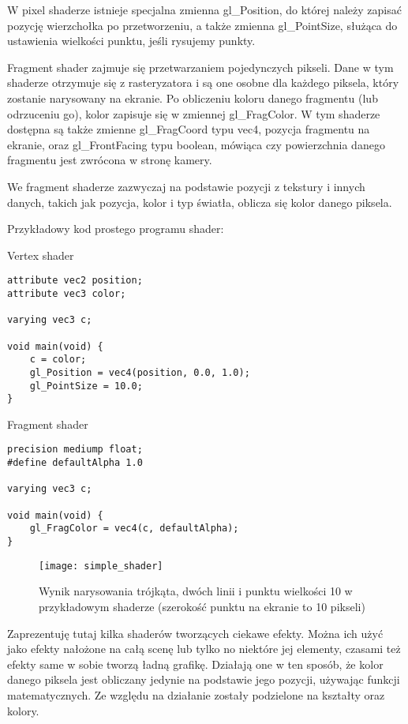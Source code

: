 W pixel shaderze istnieje specjalna zmienna gl\_Position, do której należy zapisać pozycję wierzchołka po przetworzeniu, a także zmienna gl\_PointSize, służąca do ustawienia wielko\'sci punktu, je\'sli rysujemy punkty.\bigskip

\smallskip

Fragment shader zajmuje się przetwarzaniem pojedynczych pikseli. Dane w tym shaderze otrzymuje się z rasteryzatora i są one osobne dla każdego piksela, który zostanie narysowany na ekranie. Po obliczeniu koloru danego fragmentu (lub odrzuceniu go), kolor zapisuje się w zmiennej gl\_FragColor. W tym shaderze dostępna są także zmienne gl\_FragCoord typu vec4, pozycja fragmentu na ekranie, oraz gl\_FrontFacing typu boolean, mówiąca czy powierzchnia danego fragmentu jest zwrócona w stronę kamery.

We fragment shaderze zazwyczaj na podstawie pozycji z tekstury i innych danych, takich jak pozycja, kolor i typ \'swiatła, oblicza się kolor danego piksela.\bigskip

\noindent Przykładowy kod prostego programu shader:\smallskip

{\large Vertex shader}
\begin{lstlisting}
attribute vec2 position;
attribute vec3 color;

varying vec3 c;

void main(void) {
	c = color;
	gl_Position = vec4(position, 0.0, 1.0);
	gl_PointSize = 10.0;
}
\end{lstlisting}\newpage

{\large Fragment shader}
\begin{lstlisting}
precision mediump float;
#define defaultAlpha 1.0

varying vec3 c;

void main(void) {
	gl_FragColor = vec4(c, defaultAlpha);
}
\end{lstlisting}
\begin{figure}[h]
	\centering
	\noindent\texttt{[image: simple\_shader]}
	\caption{Wynik narysowania trójkąta, dwóch linii i punktu wielko\'sci 10 w przykładowym shaderze (szeroko\'sć punktu na ekranie to 10 pikseli)}
\end{figure}\vfill

\newpage{}

Zaprezentuję tutaj kilka shaderów tworzących ciekawe efekty. Można ich użyć jako efekty nałożone na całą scenę lub tylko no niektóre jej elementy, czasami też efekty same w sobie tworzą ładną grafikę.
Działają one w ten sposób, że kolor danego piksela jest obliczany jedynie na podstawie jego pozycji, używając funkcji matematycznych. Ze względu na działanie zostały podzielone na kształty oraz kolory.\bigskip

